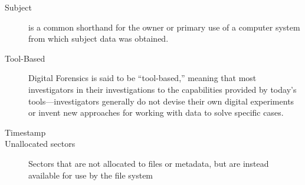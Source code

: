 \begin{description}
\item[Subject] is a common shorthand for the owner or primary use of a computer
  system from which subject data was obtained. 
\item[Tool-Based] Digital Forensics is said to be ``tool-based,''
  meaning that most investigators in their investigations to the
  capabilities provided by today's tools---investigators generally do
  not devise their own digital experiments or invent new approaches
  for working with data to solve specific cases.
\item[Timestamp]
\item[Unallocated sectors] Sectors that are not allocated to files or
  metadata, but are instead available for use by the file system
\end{description}
